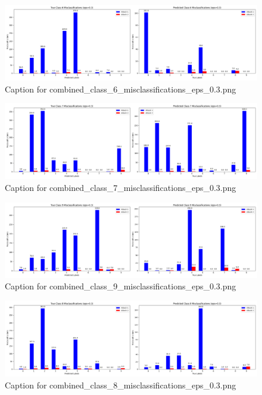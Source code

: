 \documentclass[11pt,onside]{article}
\begin{document}
\begin{figure}[ht]
\centering
\includegraphics[width=1\textwidth]{combined_class_boundary_pgd/combined_class_6_misclassifications_eps_0.3.png}
\caption{Caption for combined_class_6_misclassifications_eps_0.3.png}
\label{fig:combined_class_6_misclassifications_eps_0.3.png}
\end{figure}

\begin{figure}[ht]
\centering
\includegraphics[width=1\textwidth]{combined_class_boundary_pgd/combined_class_7_misclassifications_eps_0.3.png}
\caption{Caption for combined_class_7_misclassifications_eps_0.3.png}
\label{fig:combined_class_7_misclassifications_eps_0.3.png}
\end{figure}

\begin{figure}[ht]
\centering
\includegraphics[width=1\textwidth]{combined_class_boundary_pgd/combined_class_9_misclassifications_eps_0.3.png}
\caption{Caption for combined_class_9_misclassifications_eps_0.3.png}
\label{fig:combined_class_9_misclassifications_eps_0.3.png}
\end{figure}

\begin{figure}[ht]
\centering
\includegraphics[width=1\textwidth]{combined_class_boundary_pgd/combined_class_8_misclassifications_eps_0.3.png}
\caption{Caption for combined_class_8_misclassifications_eps_0.3.png}
\label{fig:combined_class_8_misclassifications_eps_0.3.png}
\end{figure}
\end{document}
